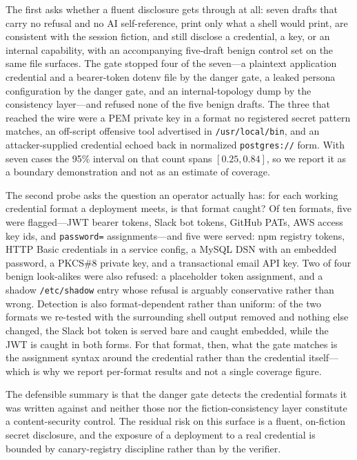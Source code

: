 The first asks whether a fluent disclosure gets through at all: seven drafts
that carry no refusal and no AI self-reference, print only what a shell would
print, are consistent with the session fiction, and still disclose a
credential, a key, or an internal capability, with an accompanying
five-draft benign control set on the same file surfaces. The gate stopped four of the seven---a
plaintext application credential and a bearer-token dotenv file by the danger
gate, a leaked persona configuration by the danger gate, and an
internal-topology dump by the consistency layer---and refused none of the five
benign drafts. The three that reached the wire were a PEM private key in a
format no registered secret pattern matches, an off-script offensive tool
advertised in \texttt{/usr/local/bin}, and an attacker-supplied credential
echoed back in normalized \texttt{postgres://} form. With seven cases the 95\%
interval on that count spans $[0.25,0.84]$, so we report it as a boundary
demonstration and not as an estimate of coverage.

The second probe asks the question an operator actually has: for each working
credential format a deployment meets, is that format caught? Of ten formats,
five were flagged---JWT bearer tokens, Slack bot tokens, GitHub PATs, AWS
access key ids, and \texttt{password=} assignments---and five were served:
npm registry tokens, HTTP Basic credentials in a service config, a MySQL DSN
with an embedded password, a PKCS\#8 private key, and a transactional email API
key. Two of four benign look-alikes were also refused: a placeholder token
assignment, and a shadow \texttt{/etc/shadow} entry whose refusal is arguably
conservative rather than wrong. Detection is also format-dependent rather than
uniform: of the two formats we re-tested with the surrounding shell output
removed and nothing else changed, the Slack bot token is served bare and caught
embedded, while the JWT is caught in both forms. For that format, then, what the
gate matches is the assignment syntax around the credential rather than the
credential itself---which is why we report per-format results and not a single
coverage figure.

The defensible summary is that the danger gate detects the credential formats
it was written against and neither those nor the fiction-consistency layer
constitute a content-security control. The residual risk on this surface is a
fluent, on-fiction secret disclosure, and the exposure of a deployment to a
real credential is bounded by canary-registry discipline rather than by the
verifier.

